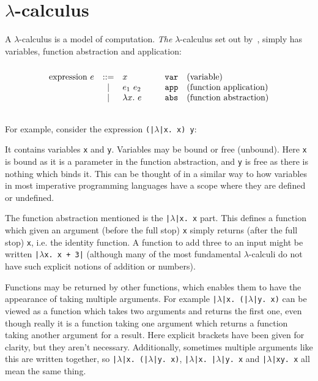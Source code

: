 \documentclass[a4paper,fleqn,oneside,12pt]{report}
\begin{document}
\section{\texorpdfstring{$\lambda$-}{Lambda }calculus}\label{id:h.odw4vku9eizz}

A $\lambda$-calculus is a model of computation. \textit{The} $\lambda$-calculus set out by~\cite{ref10}, simply has variables, function abstraction and application:
$$\begin{array}{lcllll}
  \\
    \textrm{expression}\ e & ::= & x                       & \hspace{0.25cm} & \mathtt{var} & \textrm{(variable)}\\
                         & \vert & e_1\ e_2                                & & \mathtt{app} & \textrm{(function application)}\\
                         & \vert & \lambda x.\ e                           & & \mathtt{abs} & \textrm{(function abstraction)} \\
  \\
\end{array}$$

For example, consider the expression \texttt{(|$\lambda$|x. x) y}:

It contains variables \texttt{x} and \texttt{y}. Variables may be bound or free (unbound). Here \texttt{x} is bound as it is a parameter in the function abstraction, and \texttt{y} is free as there is nothing which binds it. This can be thought of in a similar way to how variables in most imperative programming languages have a scope where they are defined or undefined.

The function abstraction mentioned is the \texttt{|$\lambda$|x. x} part. This defines a function which given an argument (before the full stop) \texttt{x} simply returns (after the full stop) \texttt{x}, i.e. the identity function. A function to add three to an input might be written \texttt{|$\lambda$x. x + 3|} (although many of the most fundamental $\lambda$-calculi do not have such explicit notions of addition or numbers).

Functions may be returned by other functions, which enables them to have the appearance of taking multiple arguments. For example \texttt{|$\lambda$|x. (|$\lambda$|y. x)} can be viewed as a function which takes two arguments and returns the first one, even though really it is a function taking one argument which returns a function taking another argument for a result. Here explicit brackets have been given for clarity, but they aren’t necessary. Additionally, sometimes multiple arguments like this are written together, so \texttt{|$\lambda$|x. (|$\lambda$|y. x)}, \texttt{|$\lambda$|x. |$\lambda$|y. x} and \texttt{|$\lambda$|xy. x} all mean the same thing.
\end{document}
